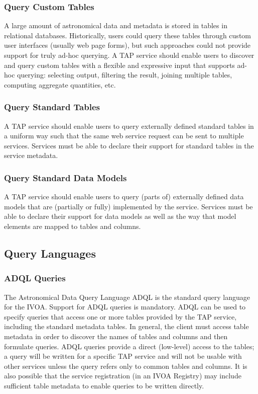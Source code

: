 \documentclass[11pt,letter]{ivoa}
\begin{document}
\subsubsection{Query Custom Tables}
A large amount of astronomical data and metadata is stored in tables in 
relational databases. Historically, users could query these tables through 
custom user interfaces (usually web page forms), but such approaches could not 
provide support for truly ad-hoc querying. A TAP service should enable users to 
discover and query custom tables with a flexible and expressive input that 
supports ad-hoc querying: selecting output, filtering the result, joining 
multiple tables, computing aggregate quantities, etc. 

\subsubsection{Query Standard Tables}
A TAP service should enable users to query externally defined standard tables 
in a uniform way such that the same web service request can be sent to multiple 
services. Services must be able to declare their support for standard tables in 
the service metadata.

\subsubsection{Query Standard Data Models}
A TAP service should enable users to query (parts of) externally defined data 
models that are (partially or fully) implemented by the service. Services must 
be able to declare their support for data models as well as the way that model 
elements are mapped to tables and columns.

\subsection{Query Languages}

\subsubsection{ADQL Queries}
The Astronomical Data Query Language ADQL \citep{2008ivoa.spec.1030O} is the standard 
query language for the IVOA. Support for ADQL queries is mandatory. ADQL can be 
used to specify queries  that access one or more tables provided by the TAP 
service, including the standard metadata tables. In general, the client must 
access table metadata in order to discover the names of tables and columns and 
then formulate queries. ADQL queries provide a direct (low-level) access to the 
tables; a query will be written for a specific TAP service and will not be 
usable with other services unless the query refers only to common tables and 
columns. It is also possible that the service registration (in an IVOA Registry) 
may include sufficient table metadata to enable queries to be written directly.
\end{document}
